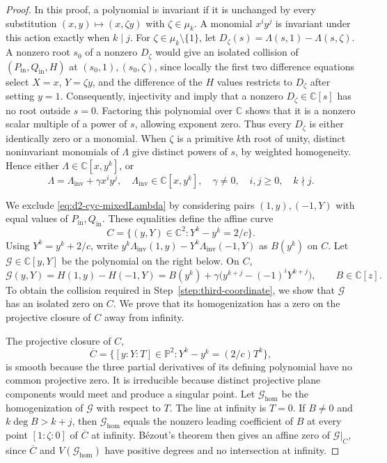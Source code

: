 \documentclass[11pt,letterpaper]{article}
\numberwithin{equation}{section}
\theoremstyle{remark}
\theoremstyle{plain}
\newcommand{\C}{\mathbb{C}}
\begin{document}
\begin{proof}
In this proof, a polynomial is invariant if it is unchanged by every
substitution $(x,y)\mapsto(x,\zeta y)$ with $\zeta\in\mu_k$.
A monomial $x^iy^j$ is invariant under this action exactly when $k\mid j$.
For $\zeta\in\mu_k\setminus\{1\}$, let
$D_\zeta(s)=\Lambda(s,1)-\Lambda(s,\zeta)$.
A nonzero root $s_0$ of a nonzero $D_\zeta$ would give an isolated
collision of $(P_{\mathrm{in}},Q_{\mathrm{in}},H)$ at
$(s_0,1),(s_0,\zeta)$, since locally the first two
difference equations select $X=x$, $Y=\zeta y$, and the difference
of the $H$ values restricts to $D_\zeta$ after setting $y=1$.
Consequently, injectivity and  imply that
a nonzero $D_\zeta\in\C[s]$ has no root outside $s=0$.
Factoring this polynomial over $\C$ shows that it is a nonzero
scalar multiple of a power of $s$, allowing exponent zero.
Thus every $D_\zeta$ is either identically zero or a monomial.
When $\zeta$ is a primitive $k$th root of unity, distinct noninvariant monomials of
$\Lambda$ give distinct powers of $s$, by weighted homogeneity.
Hence either $\Lambda\in\C[x,y^k]$, or
\begin{equation}
 \Lambda=\Lambda_{\mathrm{inv}}+\gamma x^iy^j,
 \quad \Lambda_{\mathrm{inv}}\in\C[x,y^k],\quad
 \gamma\neq0,\quad i,j\geq0,\quad k\nmid j.            \label{eq:d2-cyc-mixedLambda}
\end{equation}

We exclude \eqref{eq:d2-cyc-mixedLambda} by considering pairs
$(1,y),(-1,Y)$ with equal values of $P_{\mathrm{in}},Q_{\mathrm{in}}$.
These equalities define the affine curve
\[
 C=\{(y,Y)\in\C^2:Y^k-y^k=2/c\}.
\]
Using $Y^k=y^k+2/c$, write
$y^k\Lambda_{\mathrm{inv}}(1,y)-Y^k\Lambda_{\mathrm{inv}}(-1,Y)$
as $B(y^k)$ on $C$.
Let $\mathcal G\in\C[y,Y]$ be the polynomial on the right below.
On $C$,
\[
 \mathcal G(y,Y)=H(1,y)-H(-1,Y)
 =B(y^k)+\gamma\bigl(y^{k+j}-(-1)^iY^{k+j}\bigr),
 \qquad B\in\C[z].
\]
To obtain the collision required in Step~\ref{step:third-coordinate},
we show that $\mathcal G$ has an isolated zero on $C$.
We prove that its homogenization has a zero on the projective closure
of $C$ away from infinity.

The projective closure of $C$,
\[
 \overline C=\{[y:Y:T]\in\mathbb P^2:Y^k-y^k=(2/c)T^k\},
\]
is smooth because the three partial derivatives of its defining
polynomial have no common projective zero.  It is irreducible because
distinct projective plane components would meet and produce a
singular point.  Let $\mathcal G_{\mathrm{hom}}$ be the
homogenization of $\mathcal G$ with respect to $T$.  The line at
infinity is $T=0$.
If $B\neq0$ and $k\deg B>k+j$, then
$\mathcal G_{\mathrm{hom}}$ equals the nonzero leading coefficient
of $B$ at every point $[1:\zeta:0]$ of $\overline C$ at infinity.
B\'ezout's theorem \cite[Section~2.6, p.~54]{CasasAlvero}
then gives an affine zero of $\mathcal G|_C$,
since $\overline C$ and $V(\mathcal G_{\mathrm{hom}})$ have positive
degrees and no intersection at infinity.


\end{proof}
\end{document}
